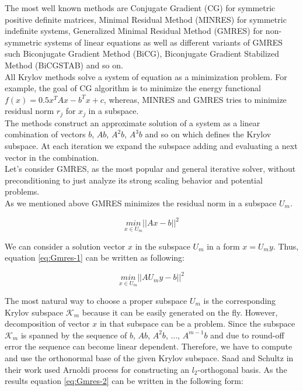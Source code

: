 The most well known methods are Conjugate Gradient (CG) for symmetric positive definite matrices, Minimal Residual Method (MINRES) for symmetric indefinite systems, Generalized Minimal Residual Method (GMRES) for non-symmetric systems of linear equations as well as different variants of GMRES such Biconjugate Gradient Method (BiCG), Biconjugate Gradient Stabilized Method (BiCGSTAB) and so on.\\

All Krylov methods solve a system of equation as a minimization problem. For example, the goal of CG algorithm is to minimize the energy functional $f(x) = 0.5 x^T A x - b^T x + c$, whereas, MINRES and GMRES tries to minimize residual norm $r_{j}$ for $x_{j}$ in a subspace. \\


The methods construct an approximate solution of a system as a linear combination of vectors $b$, $Ab$, $A^2b$, $A^3b$ and so on which defines the Krylov subspace. At each iteration we expand the subspace adding and evaluating a next vector in the combination.\\

Let's consider GMRES, as the most popular and general iterative solver, without preconditioning to just analyze its strong scaling behavior and potential problems. \\ 

As we mentioned above GMRES minimizes the residual norm in a subspace $U_m$.

\begin{equation} \label{eq:Gmres-1}
	\underset{x \in U_m}{min}||Ax - b||^2
\end{equation}

We can consider a solution vector $x$ in the subspace $U_m$ in a form $x=U_m y$. Thus, equation \ref{eq:Gmres-1} can be written as following:

\begin{equation} \label{eq:Gmres-2}
	\underset{x \in U_m}{min}||AU_m y - b||^2
\end{equation}

The most natural way to choose a proper subspace $U_m$ is the corresponding Krylov subspace $\mathcal{K}_m$ because it can be easily generated on the fly. However, decomposition of vector $x$ in that subspace can be a problem. Since the subspace $\mathcal{K}_m$ is spanned by the sequence of $b$, $Ab$, $A^2b$, ..., $A^{m-1}b$ and due to round-off error the sequence can become linear dependent. Therefore, we have to compute and use the orthonormal base of the given Krylov subspace. Saad and Schultz in their work \cite{sparse-la:gmrese-origin} used Arnoldi process for constructing an $l_2$-orthogonal basis. As the results equation \ref{eq:Gmres-2} can be written in the following form:  \\

